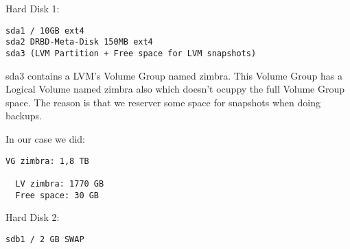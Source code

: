 Hard Disk 1:
\begin{verbatim}
sda1 / 10GB ext4
sda2 DRBD-Meta-Disk 150MB ext4
sda3 (LVM Partition + Free space for LVM snapshots)
\end{verbatim}

sda3 contains a LVM's Volume Group named zimbra.
This Volume Group has a Logical Volume named zimbra also which doesn't ocuppy the full Volume Group space. The reason is that we reserver some space for snapshots when doing backups.

In our case we did:
\begin{verbatim}
VG zimbra: 1,8 TB

  LV zimbra: 1770 GB
  Free space: 30 GB
\end{verbatim}


Hard Disk 2:
\begin{verbatim}
sdb1 / 2 GB SWAP
\end{verbatim}
